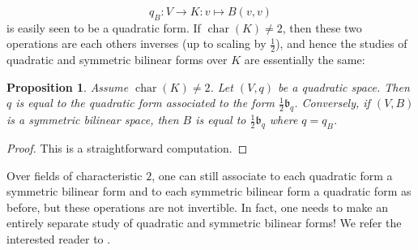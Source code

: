 \documentclass[12pt, leqno, british]{amsart}
\theoremstyle{definition}
\theoremstyle{plain}
\newtheorem{prop}[defi]{Proposition}
\theoremstyle{remark}
\newcommand{\mf}{\mathfrak}
\DeclareMathOperator{\charac}{char}
\begin{document}
$$ q_B : V \to K : v \mapsto B(v, v)$$
is easily seen to be a quadratic form.
If $\charac(K) \neq 2$, then these two operations are each others inverses (up to scaling by $\frac{1}{2}$), and hence the studies of quadratic and symmetric bilinear forms over $K$ are essentially the same:
\begin{prop}\label{P:quadratic-vs-SBS}
Assume $\charac(K) \neq 2$. Let $(V, q)$ be a quadratic space.
Then $q$ is equal to the quadratic form associated to the form $\frac{1}{2}\mf{b}_q$.
Conversely, if $(V, B)$ is a symmetric bilinear space, then $B$ is equal to $\frac{1}{2}\mf{b}_q$ where $q = q_B$.
\end{prop}
\begin{proof}
This is a straightforward computation.
\end{proof}
Over fields of characteristic $2$, one can still associate to each quadratic form a symmetric bilinear form and to each symmetric bilinear form a quadratic form as before, but these operations are not invertible.
In fact, one needs to make an entirely separate study of quadratic and symmetric bilinear forms! We refer the interested reader to \autocite[Chapters I and II]{ElmanKarpenkoMerkurjev}.
\end{document}
